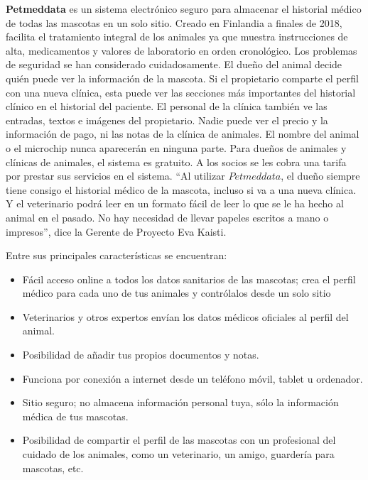 \textbf{Petmeddata}  es un sistema electrónico seguro para almacenar el historial médico de todas las mascotas en un solo sitio. Creado en Finlandia a finales de 2018, facilita el tratamiento integral de los animales ya que muestra instrucciones de alta, medicamentos y valores de laboratorio en orden cronológico. Los problemas de seguridad se han considerado cuidadosamente. El dueño del animal decide quién puede ver la información de la mascota. Si el propietario comparte el perfil con una nueva clínica, esta puede ver las secciones más importantes del historial clínico en el historial del paciente. El personal de la clínica también ve las entradas, textos e imágenes del propietario. Nadie puede ver el precio y la información de pago, ni las notas de la clínica de animales. El nombre del animal o el microchip nunca aparecerán en ninguna parte. Para dueños de animales y clínicas de animales, el sistema es gratuito. A los socios se les cobra una tarifa por prestar sus servicios en el sistema.
“Al utilizar $Petmeddata$, el dueño siempre tiene consigo el historial médico de la mascota, incluso si va a una nueva clínica. Y el veterinario podrá leer en un formato fácil de leer lo que se le ha hecho al animal en el pasado. No hay necesidad de llevar papeles escritos a mano o impresos”, dice la Gerente de Proyecto Eva Kaisti.

Entre sus principales características se encuentran:
\begin{itemize}


\item	Fácil acceso online a todos los datos sanitarios de las mascotas; crea el perfil médico para cada uno de tus animales y contrólalos desde un solo sitio
\item	Veterinarios y otros expertos envían los datos médicos oficiales al perfil del animal.
\item	Posibilidad de añadir tus propios documentos y notas.
\item	Funciona por conexión a internet desde un teléfono móvil, tablet u ordenador.
\item	Sitio seguro; no almacena información personal tuya, sólo la información médica de tus mascotas.
\item	Posibilidad de compartir el perfil de las mascotas con un profesional del cuidado de los animales, como un veterinario, un amigo, guardería para mascotas, etc.
\end{itemize}



